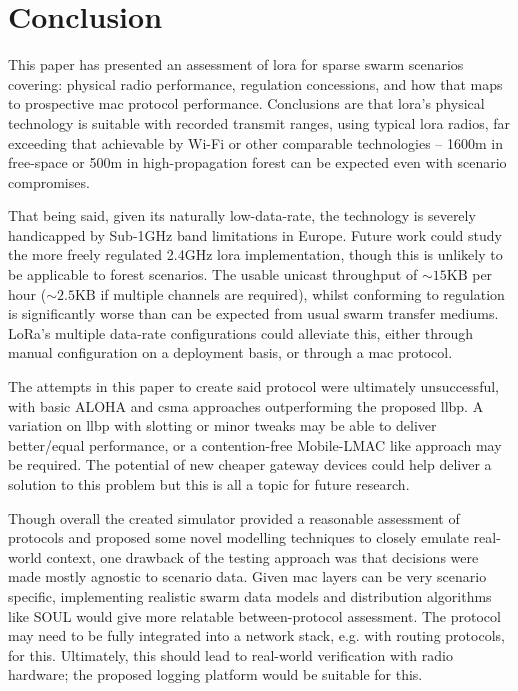 \chapter{Conclusion}
This paper has presented an assessment of \ac{lora} for sparse swarm scenarios covering: physical radio performance, regulation concessions, and how that maps to prospective \ac{mac} protocol performance. Conclusions are that \ac{lora}'s physical technology is suitable with recorded transmit ranges, using typical \ac{lora} radios, far exceeding that achievable by Wi-Fi or other comparable technologies -- 1600m in free-space or 500m in high-propagation forest can be expected even with scenario compromises. 

That being said, given its naturally low-data-rate, the technology is severely handicapped by Sub-1GHz band limitations in Europe. Future work could study the more freely regulated 2.4GHz \ac{lora} implementation, though this is unlikely to be applicable to forest scenarios. The usable unicast throughput of ${\sim}15\text{KB}$ per hour (${\sim}2.5\text{KB}$ if multiple channels are required),  whilst conforming to regulation is significantly worse than can be expected from usual swarm transfer mediums. LoRa's multiple data-rate configurations could alleviate this, either through manual configuration on a deployment basis, or through a \ac{mac} protocol. 

The attempts in this paper to create said protocol were ultimately unsuccessful, with basic ALOHA and \ac{csma} approaches outperforming the proposed \ac{llbp}. A variation on \ac{llbp} with slotting or minor tweaks may be able to deliver better/equal performance, or a contention-free Mobile-LMAC \cite{3YP:WSN_BOOK} like approach may be required. The potential of new cheaper gateway devices could help deliver a solution to this problem but this is all a topic for future research.

Though overall the created simulator provided a reasonable assessment of protocols and proposed some novel modelling techniques to closely emulate real-world context, one drawback of the testing approach was that decisions were made mostly agnostic to scenario data. Given \ac{mac} layers can be very scenario specific, implementing realistic swarm data models and distribution algorithms like SOUL \cite{3YP:SOUL} would give more relatable between-protocol assessment. The protocol may need to be fully integrated into a network stack, e.g. with routing protocols, for this. Ultimately, this should lead to real-world verification with radio hardware; the proposed logging platform would be suitable for this.



